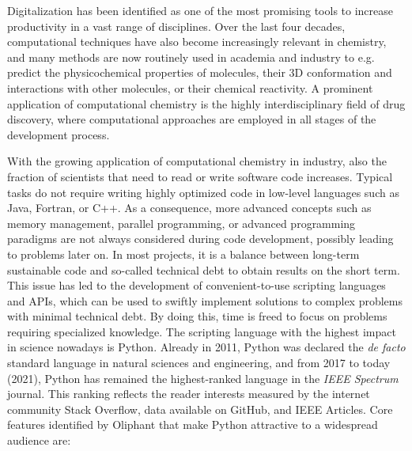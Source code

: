 Digitalization has been identified as one of the most promising tools to increase productivity in a vast range of disciplines.\cite{Tuomi2018}
Over the last four decades, computational techniques have also become increasingly relevant in chemistry, and many methods are now routinely used in academia and industry to e.g. predict the physicochemical properties of molecules, their 3D conformation and interactions with other molecules, or their chemical reactivity. A prominent application of computational chemistry is the highly interdisciplinary field of drug discovery, where computational approaches are employed in all stages of the development process.\cite{Chodera2011, Hansen2014, Abel2017, Cournia2017, Cournia2020, Meier2021}

With the growing application of computational chemistry in industry, also the fraction of scientists that need to read or write software code increases. Typical tasks do not require writing highly optimized code in low-level languages such as Java\cite{Gosling2000}, Fortran\cite{Backus1957}, or C++\cite{Stroustrup1995}. As a consequence, more advanced concepts such as memory management, parallel programming, or advanced programming paradigms are not always considered during code development, possibly leading to problems later on. In most projects, it is a balance between long-term sustainable code and so-called technical debt\cite{Alfayez2018} to obtain results on the short term. This issue has led to the development of convenient-to-use scripting languages and APIs, which can be used to swiftly implement solutions to complex problems with minimal technical debt. By doing this, time is freed to focus on problems requiring specialized knowledge.\cite{Ayer2014} The scripting language with the highest impact in science nowadays is Python. Already in 2011, Python was declared the \textit{de facto} standard language in natural sciences and engineering, and from 2017 to today (2021), Python has remained the highest-ranked language in the \textit{IEEE Spectrum} journal. This ranking reflects the reader interests measured by the internet community Stack Overflow, data available on GitHub, and IEEE Articles. \cite{Millman2011, Vanderwalt2011, Cass2017, Cass2018, Cass2019, Cass2020, Cass2021} 
%
Core features identified by Oliphant\cite{Oliphant2007} that make Python attractive to a widespread audience are: 
